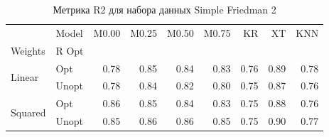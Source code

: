 \begin{table}
\caption{Метрика R2 для набора данных Simple Friedman 2}
\label{tab:R2_Simple Friedman 2}
\begin{tabular}{llrrrrrrr}
\toprule
 & Model & M0.00 & M0.25 & M0.50 & M0.75 & KR & XT & KNN \\
Weights & R Opt &  &  &  &  &  &  &  \\
\midrule
\multirow[t]{2}{*}{Linear} & Opt & 0.78 & 0.85 & 0.84 & 0.83 & 0.76 & 0.89 & 0.78 \\
 & Unopt & 0.78 & 0.84 & 0.82 & 0.80 & 0.75 & 0.87 & 0.76 \\

\multirow[t]{2}{*}{Squared} & Opt & 0.86 & 0.85 & 0.84 & 0.83 & 0.75 & 0.88 & 0.76 \\
 & Unopt & 0.85 & 0.86 & 0.86 & 0.85 & 0.75 & 0.90 & 0.77 \\

\bottomrule
\end{tabular}
\end{table}
